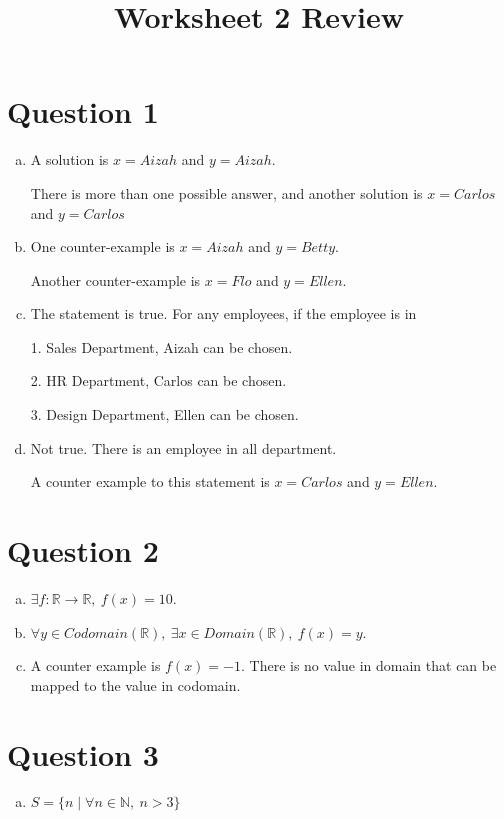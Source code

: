 \documentclass[12pt]{article}
\begin{document}
\title{Worksheet 2 Review}
\maketitle

\section*{Question 1}
\begin{enumerate}[a.]
    \item

    A solution is $x = Aizah$ and $y = Aizah$.

    \bigskip

    There is more than one possible answer, and another solution is $x = Carlos$
    and $y = Carlos$

    \item

    One counter-example is $x = Aizah$ and $y = Betty$.

    \bigskip

    Another counter-example is $x = Flo$ and $y = Ellen$.

    \item

    The statement is true. For any employees, if the employee is in

    \bigskip

    1. Sales Department, Aizah can be chosen.

    2. HR Department, Carlos can be chosen.

    3. Design Department, Ellen can be chosen.

    \item

    Not true. There is an employee in all department.

    \bigskip

    A counter example to this statement is $x = Carlos$ and $y = Ellen$.

\end{enumerate}

\section*{Question 2}
\begin{enumerate}[a.]
    \item

    $\exists f: \mathbb{R} \to \mathbb{R},\: f(x) = 10$.

    \item

    $\forall y \in Codomain(\mathbb{R}),\:\exists x \in Domain(\mathbb{R}),\:
    f(x) = y$.

    \item

    A counter example is $f(x) = -1$. There is no value in domain that can be
    mapped to the value in codomain.

\end{enumerate}

\section*{Question 3}
\begin{enumerate}[a.]
    \item

    $S = \{n \mid \forall n \in \mathbb{N},\:n > 3\}$

\end{enumerate}
\end{document}

